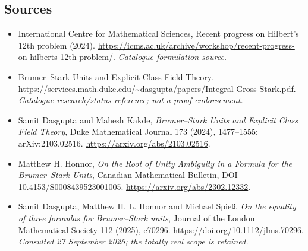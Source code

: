 \documentclass[11pt,a4paper]{article}
\numberwithin{equation}{section}
\begin{document}

\subsection{Sources}
\begin{itemize}\raggedright
\item[\textnormal{[S1]}]\hypertarget{source:statement:1}{} International Centre for Mathematical Sciences, Recent progress on Hilbert's 12th problem (2024).
\url{https://icms.ac.uk/archive/workshop/recent-progress-on-hilberts-12th-problem/}.
{\small\textit{Catalogue formulation source.}}
\item[\textnormal{[S2]}]\hypertarget{source:statement:2}{} Brumer–Stark Units and Explicit Class Field Theory.
\url{https://services.math.duke.edu/~dasgupta/papers/Integral-Gross-Stark.pdf}.
{\small\textit{Catalogue research/status reference; not a proof endorsement.}}
\item[\textnormal{[E1]}]\hypertarget{extra:statement:1}{} Samit Dasgupta and Mahesh Kakde,
\emph{Brumer--Stark Units and Explicit Class Field Theory}, Duke Mathematical
Journal 173 (2024), 1477--1555; arXiv:2103.02516.
\url{https://arxiv.org/abs/2103.02516}.
\item[\textnormal{[E2]}]\hypertarget{extra:statement:2}{} Matthew H. Honnor,
\emph{On the Root of Unity Ambiguity in a Formula for the Brumer--Stark Units},
Canadian Mathematical Bulletin, DOI 10.4153/S0008439523001005.
\url{https://arxiv.org/abs/2302.12332}.
\item[\textnormal{[E3]}]\hypertarget{extra:statement:3}{} Samit Dasgupta, Matthew H. L. Honnor
and Michael Spie\ss, \emph{On the equality of three formulas for Brumer--Stark units},
Journal of the London Mathematical Society 112 (2025), e70296.
\url{https://doi.org/10.1112/jlms.70296}.
{\small\textit{Consulted 27 September 2026; the totally real scope is retained.}}

\end{itemize}

\end{document}
